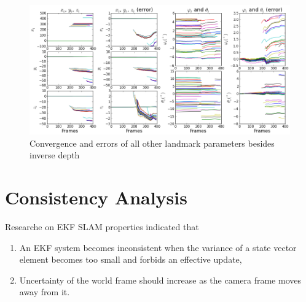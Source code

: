 \begin{figure}[h]
\centering
\includegraphics[width=14cm, keepaspectratio=true]
{./Figures/fltfig/cut1/Figure20.png}
\caption{Convergence and errors of all other landmark parameters
  besides inverse depth}
\label{fltfig:2}
\end{figure}
\FloatBarrier

\section{Consistency Analysis}\label{sec:flight-consistency}
Researche on EKF SLAM properties indicated that 
\begin{enumerate}
  \item An EKF system becomes inconsistent when the variance of a state
  vector element becomes too small and forbids an effective update,
  \item Uncertainty of the world frame should increase as the
  camera frame moves away from it.
\end{enumerate}

